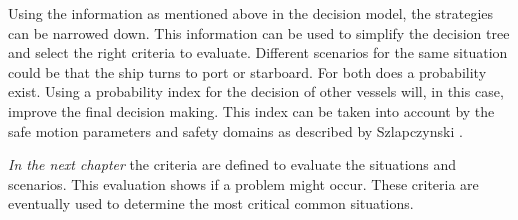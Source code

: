 Using the information as mentioned above in the decision model, the strategies can be narrowed down. This information can be used to simplify the decision tree and select the right criteria to evaluate.
Different scenarios for the same situation could be that the ship turns to port or starboard. For both does a probability exist. Using a probability index for the decision of other vessels will, in this case, improve the final decision making. This index can be taken into account by the safe motion parameters and safety domains as described by Szlapczynski \cite{Szlapczynski2017}\cite{Szlapczynski2017a}.

\vspace{1.5cm}
\emph{In the next chapter} the criteria are defined to evaluate the situations and scenarios. This evaluation shows if a problem might occur. These criteria are eventually used to determine the most critical common situations. 

